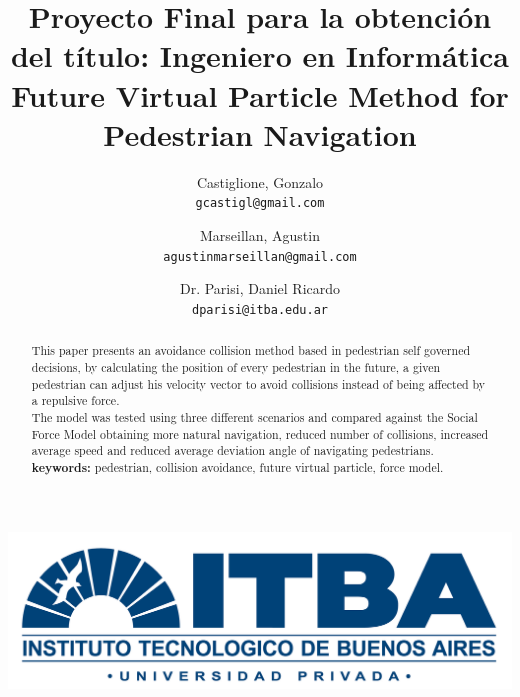\documentclass[english]{article}
\providecommand{\tabularnewline}{\\}
\begin{document}
\title{
    Proyecto Final para la obtención del título: Ingeniero en Informática
    \tabularnewline
    \large Future Virtual Particle Method for Pedestrian Navigation
}

\author{
  Castiglione, Gonzalo\\
  \texttt{gcastigl@gmail.com}
  \and
  Marseillan, Agustin\\
  \texttt{agustinmarseillan@gmail.com}
  \and
  Dr. Parisi, Daniel Ricardo \\
  \texttt{dparisi@itba.edu.ar}
}
\date{}

\maketitle

\vspace{8cm}
\begin{center}
    \includegraphics[scale=0.1]{pics/ITBA}
    \par
\end{center}

\pagebreak{}

\tableofcontents{}

\pagebreak{}

\begin{abstract}
This paper presents an avoidance collision method based in pedestrian self
governed decisions, by calculating the position of every pedestrian
in the future, a given pedestrian can adjust his velocity vector to
avoid collisions instead of being affected by a repulsive force. \\
The model was tested using three different scenarios and compared 
against the Social Force Model obtaining more natural navigation,
reduced number of collisions, increased average
speed and reduced average deviation angle of navigating pedestrians.
\textbf{keywords:} pedestrian, collision avoidance, future virtual
particle, force model.
\end{abstract}
\end{document}

